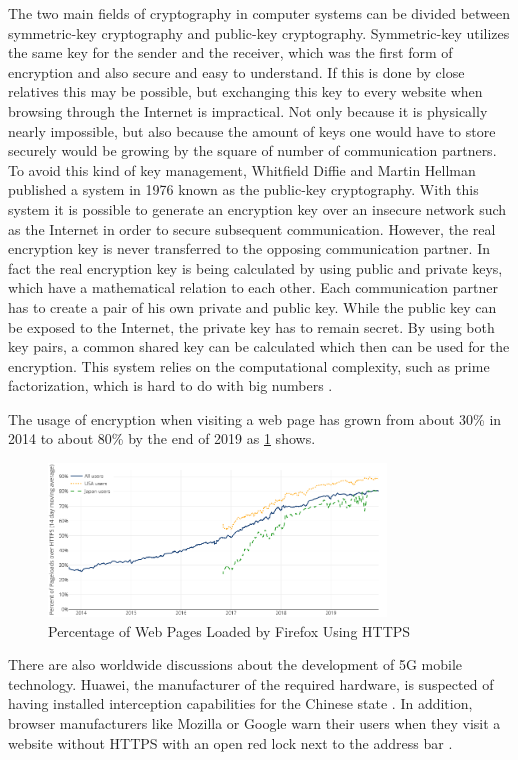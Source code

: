\documentclass[12pt,oneside,a4paper,parskip]{scrbook}
\begin{document}
The two main fields of cryptography in computer systems can be divided between symmetric-key cryptography and public-key cryptography. Symmetric-key utilizes the same key for the sender and the receiver, which was the first form of encryption and also secure and easy to understand. If this is done by close relatives this may be possible, but exchanging this key to every website when browsing through the Internet is impractical. Not only because it is physically nearly impossible, but also because the amount of keys one would have to store securely would be growing by the square of number of communication partners.
To avoid this kind of key management, Whitfield Diffie and Martin Hellman published a system in 1976 known as the public-key cryptography. With this system it is possible to generate an encryption key over an insecure network such as the Internet in order to secure subsequent communication. However, the real encryption key is never transferred to the opposing communication partner. In fact the real encryption key is being calculated by using public and private keys, which have a mathematical relation to each other. Each communication partner has to create a pair of his own private and public key. While the public key can be exposed to the Internet, the private key has to remain secret. 
By using both key pairs, a common shared key can be calculated which then can be used for the encryption. This system relies on the computational complexity, such as prime factorization, which is hard to do with big numbers \parencite{luber_encryption_2017}.

The usage of encryption when visiting a web page has grown from about 30\% in 2014 to about 80\% by the end of 2019 as \ref{fig:https} shows.

\begin{figure}[ht]
    \centering
    \includegraphics[width=0.8\textwidth]{ressources/https_statistics.png}
	\caption{Percentage of Web Pages Loaded by Firefox Using HTTPS \parencite{letsencrypt_lets_2019}}
	\label{fig:https}
\end{figure}
\newpage
There are also worldwide discussions about the development of 5G mobile technology. Huawei, the manufacturer of the required hardware, is suspected of having installed interception capabilities for the Chinese state \parencite{stokel-walker_banning_2019}. \newline
In addition, browser manufacturers like Mozilla or Google warn their users when they visit a website without HTTPS with an open red lock next to the address bar \parencite{google_milestone_2018}.
\end{document}
